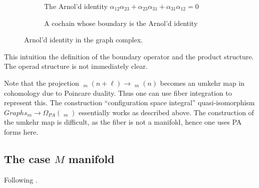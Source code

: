 \documentclass{scrartcl}
\theoremstyle{plain}
\theoremstyle{definition}
\DeclareMathOperator{\cConf}{\overline{Conf}}
\begin{document}
\begin{figure}[ht]
    \centering
    \begin{subfigure}[b]{0.65\textwidth}
        \centering
        
        \caption{The Arnol'd identity $\alpha_{12}\alpha_{23} + \alpha_{23}\alpha_{31} + \alpha_{31}\alpha_{12} = 0$}
    \end{subfigure}
    \hfill
    \begin{subfigure}[b]{0.3\textwidth}
        \centering
        
        \caption{A cochain whose boundary is the Arnol'd identity}
    \end{subfigure} 
    \caption{Arnol'd identity in the graph complex. }\label{graph-complex-ex}
\end{figure}

This intuition the definition of the boundary operator and the product structure. The operad structure is not immediately clear. 

Note that the projection $\cConf_m(n+\ell) \to \cConf_m(n)$ becomes an umkehr map in cohomology due to Poincare duality. Thus one can use fiber integration to represent this. The construction ``configuration space integral'' quasi-isomorphism $Graphs_m \to \Omega_{PA}(\cConf_m)$ essentially works as described above. The construction of the umkehr map is difficult, as the fiber is not a manifold, hence one uses PA forms here. 

\subsection{The case $M$ manifold}

Following \cite{campos2016model}. 



\end{document}
